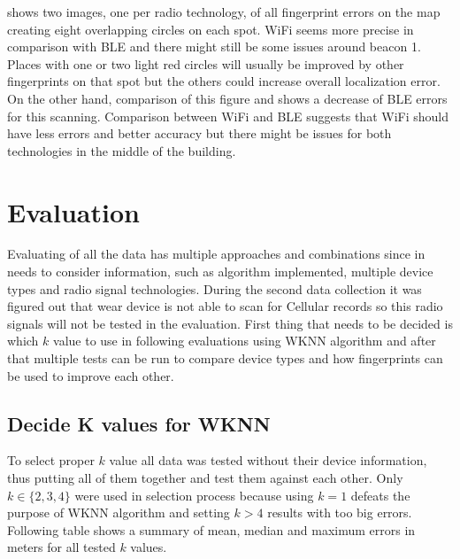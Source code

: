  shows two images, one per radio technology, of all fingerprint errors on the map creating eight overlapping circles on each spot. WiFi seems more precise in comparison with BLE and there might still be some issues around beacon 1. Places with one or two light red circles will usually be improved by other fingerprints on that spot but the others could increase overall localization error. On the other hand, comparison of this figure and  shows a decrease of BLE errors for this scanning. Comparison between WiFi and BLE suggests that WiFi should have less errors and better accuracy but there might be issues for both technologies in the middle of the building.

\section{Evaluation}\label{sec:Evaluation}
Evaluating of all the data has multiple approaches and combinations since in needs to consider information, such as algorithm implemented, multiple device types and radio signal technologies. During the second data collection it was figured out that wear device is not able to scan for Cellular records so this radio signals will not be tested in the evaluation. First thing that needs to be decided is which $k$ value to use in following evaluations using WKNN algorithm and after that multiple tests can be run to compare device types and how fingerprints can be used to improve each other.

\subsection{Decide K values for WKNN}\label{sec:TestingKValuesForWKNN}
To select proper $k$ value all data was tested without their device information, thus putting all of them together and test them against each other. Only $k \in \{2, 3, 4\}$ were used in selection process because using $k = 1$ defeats the purpose of WKNN algorithm and setting $k > 4$ results with too big errors. Following table shows a summary of mean, median and maximum errors in meters for all tested $k$ values.

